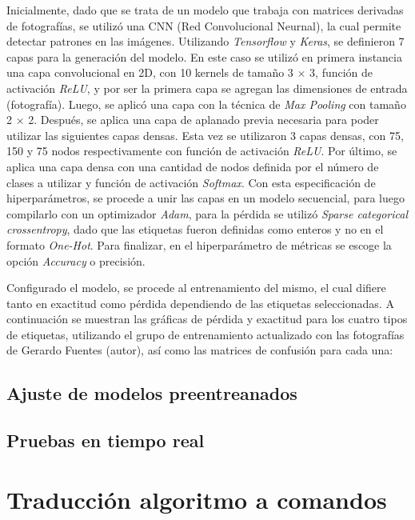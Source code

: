 Inicialmente, dado que se trata de un modelo que trabaja con matrices derivadas de fotografías, se utilizó una CNN (Red Convolucional Neurnal), la cual permite detectar patrones en las imágenes. Utilizando \textit{Tensorflow} y \textit{Keras}, se definieron 7 capas para la generación del modelo. En este caso se utilizó en primera instancia una capa convolucional en 2D, con 10 kernels de tamaño 3 $\times$ 3, función de activación \textit{ReLU}, y por ser la primera capa se agregan las dimensiones de entrada (fotografía). Luego, se aplicó una capa con la técnica de \textit{Max Pooling} con tamaño 2 $\times$ 2. Después, se aplica una capa de aplanado previa necesaria para poder utilizar las siguientes capas densas. Esta vez se utilizaron 3 capas densas, con 75, 150 y 75 nodos respectivamente con función de activación \textit{ReLU}. Por último, se aplica una capa densa con una cantidad de nodos definida por el número de clases a utilizar y función de activación \textit{Softmax}. Con esta especificación de hiperparámetros, se procede a unir las capas en un modelo secuencial, para luego compilarlo con un optimizador \textit{Adam}, para la pérdida se utilizó \textit{Sparse categorical crossentropy}, dado que las etiquetas fueron definidas como enteros y no en el formato \textit{One-Hot}. Para finalizar, en el hiperparámetro de métricas se escoge la opción \textit{Accuracy} o precisión.

Configurado el modelo, se procede al entrenamiento del mismo, el cual difiere tanto en exactitud como pérdida dependiendo de las etiquetas seleccionadas. A continuación se muestran las gráficas de pérdida y exactitud para los cuatro tipos de etiquetas, utilizando el grupo de entrenamiento actualizado con las fotografías de Gerardo Fuentes (autor), así como las matrices de confusión para cada una:


\section{Ajuste de modelos preentreanados}
\section{Pruebas en tiempo real}


\chapter{Traducción algoritmo a comandos}


